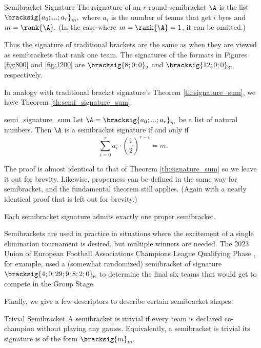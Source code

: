 {    \begin{definition}{Semibracket Signature}{}
        The \i{signature} of an $r$-round semibracket $\A$ is the list $\bracksig{a_0; ...; a_r}_m,$ where $a_i$ is the number of teams that get $i$ byes and $m = \rank{\A}.$ (In the case where $m = \rank{\A} = 1$, it can be omitted.)        
    \end{definition}

    Thus the signature of traditional brackets are the same as when they are viewed as semibrackets that rank one team. The signatures of the formats in Figures \ref{fig:800} and \ref{fig:1200} are $\bracksig{8;0;0}_2$ and $\bracksig{12;0;0}_3,$ respectively.

    In analogy with traditional bracket signature's Theorem \ref{th:signature_sum}, we have Theorem \ref{th:semi_signature_sum}.

    \begin{theorem}{}{semi_signature_sum}
        Let $\A = \bracksig{a_0; ...; a_r}_m$ be a list of natural numbers. Then $\A$ is a semibracket signature if and only if $$\sum_{i=0}^r a_i \cdot \left(\frac{1}{2}\right)^{r - i} = m.$$
    \end{theorem}

    The proof is almost identical to that of Theorem \ref{th:signature_sum} so we leave it out for brevity. Likewise, properness can be defined in the same way for semibracket, and the fundamental theorem still applies. (Again with a nearly identical proof that is left out for brevity.)

    \begin{theorem}{}{}
        Each semibracket signature admits exactly one proper semibracket.
    \end{theorem}

    Semibrackets are used in practice in situations where the excitement of a single elimination tournament is desired, but multiple winners are needed. The 2023 Union of European Football Associations Champions League Qualifying Phase \cite{wiki_uefa}, for example, used a (somewhat randomized) semibracket of signature $\bracksig{4;0;29;9;8;2;0}_6$ to determine the final six teams that would get to compete in the Group Stage.


    Finally, we give a few descriptors to describe certain semibracket shapes.

    \begin{definition}{Trivial Semibracket}{}
        A semibracket is \i{trivial} if every team is declared co-champion without playing any games. Equivalently, a semibracket is trivial its signature is of the form $\bracksig{m}_m.$
    \end{definition}

}
